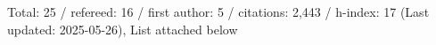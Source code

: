 Total: 25 / refereed: 16 / first author: 5 / citations: 2,443 / h-index: 17 (Last updated: 2025-05-26), List attached below